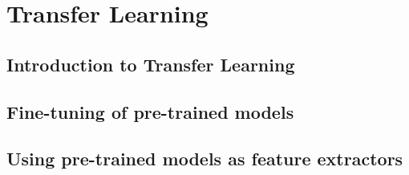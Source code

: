 \chapter{Transfer Learning}

\section{Introduction to Transfer Learning}
\section{Fine-tuning of pre-trained models}
\section{Using pre-trained models as feature extractors}

